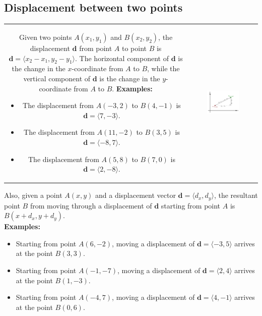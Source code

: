 \documentclass{article}
\begin{document}
\subsection*{Displacement between two points}

\begin{tabular}{cc}
\parbox{0.5\textwidth}{
Given two points \(A(x_1,y_1)\) and \(B(x_2,y_2)\), the displacement \(\mathbf{d}\) from point \(A\) to point \(B\) is \(\mathbf{d} = \langle x_2 - x_1, y_2 - y_1 \rangle\). The horizontal component of \(\mathbf{d}\) is the change in the \(x\)-coordinate from \(A\) to \(B\), while the vertical component of \(\mathbf{d}\) is the change in the \(y\)-coordinate from \(A\) to \(B\). \\
\textbf{Examples:}
\begin{itemize}
\item The displacement from \(A(-3,2)\) to \(B(4,-1)\) is \(\mathbf{d} = \langle 7, -3 \rangle\).
\item The displacement from \(A(11,-2)\) to \(B(3,5)\) is \(\mathbf{d} = \langle -8, 7 \rangle\).
\item The displacement from \(A(5,8)\) to \(B(7,0)\) is \(\mathbf{d} = \langle 2, -8 \rangle\).
\end{itemize}
} & \parbox{0.5\textwidth}{
\includegraphics[width = 0.5\textwidth]{displacement_between_points}
}
\end{tabular}

Also, given a point \(A(x,y)\) and a displacement vector \(\mathbf{d} = \langle d_x, d_y \rangle\), the resultant point \(B\) from moving through a displacement of \(\mathbf{d}\) starting from point \(A\) is \(B(x + d_x, y + d_y)\). \\
\textbf{Examples:}
\begin{itemize}
\item Starting from point \(A(6,-2)\), moving a displacement of \(\mathbf{d} = \langle -3, 5 \rangle\) arrives at the point \(B(3,3)\).
\item Starting from point \(A(-1,-7)\), moving a displacement of \(\mathbf{d} = \langle 2, 4 \rangle\) arrives at the point \(B(1,-3)\).
\item Starting from point \(A(-4, 7)\), moving a displacement of \(\mathbf{d} = \langle 4, -1 \rangle\) arrives at the point \(B(0,6)\).
\end{itemize}
\end{document}
